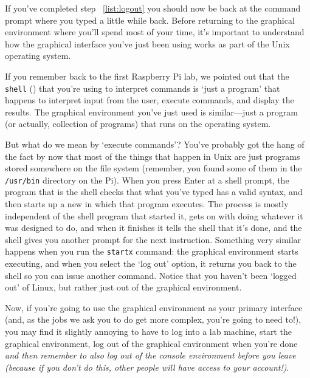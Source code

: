 
If you've completed step ~\ref{list:logout} you should now be back at the command prompt where you typed  a little while back. Before returning to the graphical environment where you'll spend most of your time, it's important to understand how the graphical interface you've just been using works as part of the Unix operating system. 

If you remember back to the first Raspberry Pi lab, we pointed out that the \texttt{shell} () that you're using to interpret commands is `just a program' that happens to interpret input from the user, execute commands, and display the results. The graphical environment you've just used is similar---just a program (or actually, collection of programs) that runs on the operating system.

But what do we mean by `execute commands'? You've probably got the hang of the fact by now that most of the things that happen in Unix are just programs stored somewhere on the file system (remember, you found some of them in the \texttt{/usr/bin} directory on the Pi). When you press Enter at a shell prompt, the program that is the shell checks that what you've typed has a valid syntax, and then starts up a new  in which that program executes. The process is mostly independent of the shell program that started it, gets on with doing whatever it was designed to do, and when it finishes it tells the shell that it's done, and the shell gives you another prompt for the next instruction. Something very similar happens when you run the \texttt{startx} command: the graphical environment starts executing, and when you select the `log out' option, it returns you back to the shell so you can issue another command. Notice that you haven't been `logged out' of Linux, but rather just out of the graphical environment. 

Now, if you're going to use the graphical environment as your primary interface (and, as the jobs we ask you to do get more complex, you're going to need to!), you may find it slightly annoying to have to log into a lab machine, start the graphical environment, log out of the graphical environment when you're done \textit{and then remember to also log out of the console environment before you leave (because if you don't do this, other people will have access to your account!)}. 

